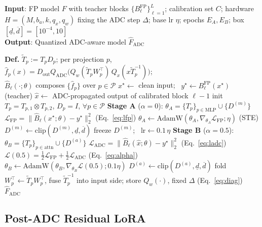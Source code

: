 \documentclass[letterpaper]{article} %
\theoremstyle{plain}
\begin{document}
\begin{algorithm}[tb]
\caption{ADC-Aware Staged PTQ Calibration}
\label{alg:calibration}
\textbf{Input}: FP model $F$ with teacher blocks $\{B^{\mathrm{FP}}_\ell\}_{\ell=1}^{L}$; calibration set $C$; hardware $H=(M,b_a,k,q_x,q_w)$ fixing the ADC step $\Delta$; base lr $\eta$; epochs $E_A,E_B$; box $[\underline{d},\overline{d}]=[10^{-4},10]$\\
\textbf{Output}: Quantized ADC-aware model $\hat{F}_{\mathrm{ADC}}$
\begin{algorithmic}[1]
\STATE \textbf{Def.} $\tilde{T}_p:=T_pD_p$; per projection $p$,\\
\quad $\hat{f}_p(x)=D_{\mathrm{out}}Q_{\mathrm{ADC}}\!\big(Q_w(\tilde{T}_pW_p^\top)\,Q_x(x\tilde{T}_p^{-1})\big)$; \\
\quad $\hat{B}_\ell(\cdot;\theta)$ composes $\{\hat{f}_p\}$ over $p\in\mathcal{P}$
\STATE $x^{\star}\!\gets$ clean input; \ $y^{\star}\!\gets B^{\mathrm{FP}}_\ell(x^{\star})$ \hfill(teacher)
\STATE $\hat{x}\gets$ ADC-propagated output of calibrated block $\ell{-}1$
\STATE init $T_p=T_{p,1}\!\otimes T_{p,2}$, $D_p=I$, $\forall p\in\mathcal{P}$
\STATE \textbf{Stage A} ($\alpha{=}0$): $\theta_A=\{T_p\}_{p\in\mathrm{MLP}}\!\cup\{D^{(m)}\}$
\STATE $\mathcal{L}_{\mathrm{FP}}=\|\hat{B}_\ell(x^{\star};\theta)-y^{\star}\|_2^2$ \hfill(Eq.~\ref{eq:lfp})
\STATE $\theta_A\gets\mathrm{AdamW}(\theta_A,\nabla_{\theta_A}\mathcal{L}_{\mathrm{FP}};\eta)$ \hfill(STE)
\STATE $D^{(m)}\gets\mathrm{clip}(D^{(m)},\underline{d},\overline{d})$
\ENDFOR
\STATE freeze $D^{(m)}$; \ $\mathrm{lr}\gets 0.1\,\eta$
\STATE \textbf{Stage B} ($\alpha{=}0.5$): $\theta_B=\{T_p\}_{p\in\mathrm{attn}}\!\cup\{D^{(a)}\}$
\STATE $\mathcal{L}_{\mathrm{ADC}}=\|\hat{B}_\ell(\hat{x};\theta)-y^{\star}\|_2^2$ \hfill(Eq.~\ref{eq:ladc})
\STATE $\mathcal{L}(0.5)=\tfrac12\mathcal{L}_{\mathrm{FP}}+\tfrac12\mathcal{L}_{\mathrm{ADC}}$ \hfill(Eq.~\ref{eq:alpha})
\STATE $\theta_B\gets\mathrm{AdamW}(\theta_B,\nabla_{\theta_B}\mathcal{L}(0.5);0.1\eta)$
\STATE $D^{(a)}\gets\mathrm{clip}(D^{(a)},\underline{d},\overline{d})$
\ENDFOR
\STATE fold $W_p^\top\!\gets\tilde{T}_pW_p^\top$, fuse $\tilde{T}_p^{-1}$ into input side; store $Q_w(\cdot)$, fixed $\Delta$ \hfill(Eq.~\ref{eq:diag})
\ENDFOR
\RETURN $\hat{F}_{\mathrm{ADC}}$
\end{algorithmic}
\end{algorithm}

\subsection{Post-ADC Residual LoRA}
\end{document}
